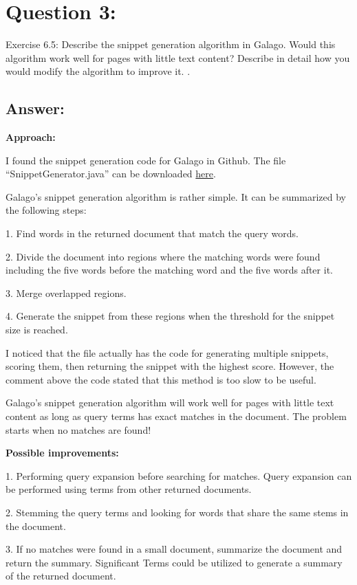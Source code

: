 \section*{Question 3:}
Exercise 6.5:
Describe the snippet generation algorithm in Galago. Would this algorithm work well for pages with little text content? Describe in detail how you would modify the algorithm to improve it. .

\subsection*{Answer:}

\textbf{Approach:}

I found the snippet generation code for Galago in Github. The file ``SnippetGenerator.java'' can be downloaded 
\href{https://github.com/jjfiv/galago-git/blob/master/core/src/main/java/org/lemurproject/galago/core/index/corpus/SnippetGenerator.java}{here}. 

Galago's snippet generation algorithm is rather simple. It can be summarized by the following steps:

1. Find words in the returned document that match the query words.

2. Divide the document into regions where the matching words were found including the five words before the matching word and the five words after it.

3. Merge overlapped regions.

4. Generate the snippet from these regions when the threshold for the snippet size is reached. 

I noticed that the file actually has the code for generating multiple snippets, scoring them, then returning the snippet with the highest score. However, the comment above the code stated that this method is too slow to be useful.

Galago's snippet generation algorithm will work well for pages with little text content as long as query terms has exact matches in the document. The problem starts when no matches are found!

\textbf{Possible improvements:}

1. Performing query expansion before searching for matches. Query expansion can be performed using terms from other returned documents.

2. Stemming the query terms and looking for words that share the same stems in the document.

3. If no matches were found in a small document, summarize the document and return the summary. Significant Terms could be utilized to generate a summary of the returned document.


